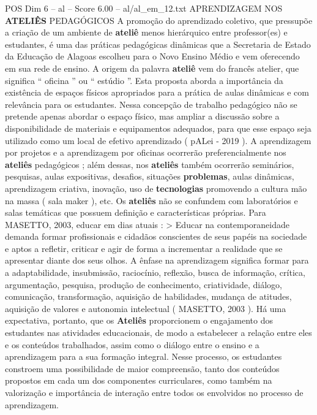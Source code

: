 \begin{textsample}{POS Dim 6 – al – Score 6.00 – al/al\_em\_12.txt}  \label{ex:f6_pos_229}
APRENDIZAGEM NOS \textbf{ATELIÊS} PEDAGÓGICOS A promoção do aprendizado coletivo, que pressupõe a criação de um ambiente de \textbf{ateliê} menos hierárquico entre professor(es) e estudantes, é uma das práticas pedagógicas dinâmicas que a Secretaria de Estado da Educação de Alagoas escolheu para o Novo Ensino Médio e vem oferecendo em sua rede de ensino.
A origem da palavra \textbf{ateliê} vem do francês atelier, que significa “ oficina ” ou “ estúdio ”.
Esta proposta aborda a importância da existência de espaços físicos apropriados para a prática de aulas dinâmicas e com relevância para os estudantes.
Nessa concepção de trabalho pedagógico não se pretende apenas abordar o espaço físico, mas ampliar a discussão sobre a disponibilidade de materiais e equipamentos adequados, para que esse espaço seja utilizado como um local de efetivo aprendizado ( pALei - 2019 ).
A aprendizagem por projetos e a aprendizagem por oficinas ocorrerão preferencialmente nos \textbf{ateliês} pedagógicos ; além dessas, nos \textbf{ateliês} também ocorrerão seminários, pesquisas, aulas expositivas, desafios, situações \textbf{problemas}, aulas dinâmicas, aprendizagem criativa, inovação, uso de \textbf{tecnologias} promovendo a cultura mão na massa ( sala maker ), etc.
Os \textbf{ateliês} não se confundem com laboratórios e salas temáticas que possuem definição e características próprias.
Para MASETTO, 2003, educar em dias atuais : > Educar na contemporaneidade demanda formar profissionais e cidadãos conscientes de seus papéis na sociedade e aptos a refletir, criticar e agir de forma a incrementar a realidade que se apresentar diante dos seus olhos.
A ênfase na aprendizagem significa formar para a adaptabilidade, insubmissão, raciocínio, reflexão, busca de informação, crítica, argumentação, pesquisa, produção de conhecimento, criatividade, diálogo, comunicação, transformação, aquisição de habilidades, mudança de atitudes, aquisição de valores e autonomia intelectual ( MASETTO, 2003 ).
Há uma expectativa, portanto, que os \textbf{Ateliês} proporcionem o engajamento dos estudantes nas atividades educacionais, de modo a estabelecer a relação entre eles e os conteúdos trabalhados, assim como o diálogo entre o ensino e a aprendizagem para a sua formação integral.
Nesse processo, os estudantes constroem uma possibilidade de maior compreensão, tanto dos conteúdos propostos em cada um dos componentes curriculares, como também na valorização e importância de interação entre todos os envolvidos no processo de aprendizagem.

\end{textsample}
